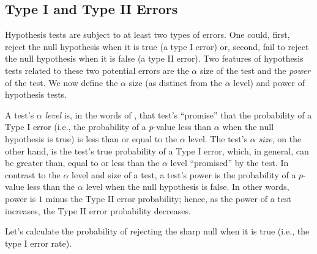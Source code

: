 \documentclass[12pt,leqno]{article}
\theoremstyle{newstyle}
\begin{document}
\hypertarget{type-i-and-type-ii-errors}{%
\subsection{Type I and Type II Errors}\label{type-i-and-type-ii-errors}}

Hypothesis tests are subject to at least two types of errors. One could,
first, reject the null hypothesis when it is true (a type I error) or,
second, fail to reject the null hypothesis when it is false (a type II
error). Two features of hypothesis tests related to these two potential
errors are the \(\alpha\) size of the test and the \textit{power} of the
test. We now define the \(\alpha\) size (as distinct from the \(\alpha\)
level) and power of hypothesis tests.

A test's \(\alpha\) \textit{level} is, in the words of
\citet{rosenbaum2010}, that test's \enquote{promise} that the
probability of a Type I error (i.e., the probability of a \(p\)-value
less than \(\alpha\) when the null hypothesis is true) is less than or
equal to the \(\alpha\) level. The test's \(\alpha\) \textit{size}, on
the other hand, is the test's true probability of a Type I error, which,
in general, can be greater than, equal to or less than the \(\alpha\)
level ``promised'' by the test. In contrast to the \(\alpha\) level and
size of a test, a test's power is the probability of a \(p\)-value less
than the \(\alpha\) level when the null hypothesis is false. In other
words, power is \(1\) minus the Type II error probability; hence, as the
power of a test increases, the Type II error probability decreases.

Let's calculate the probability of rejecting the sharp null when it is
true (i.e., the type I error rate).
\end{document}
